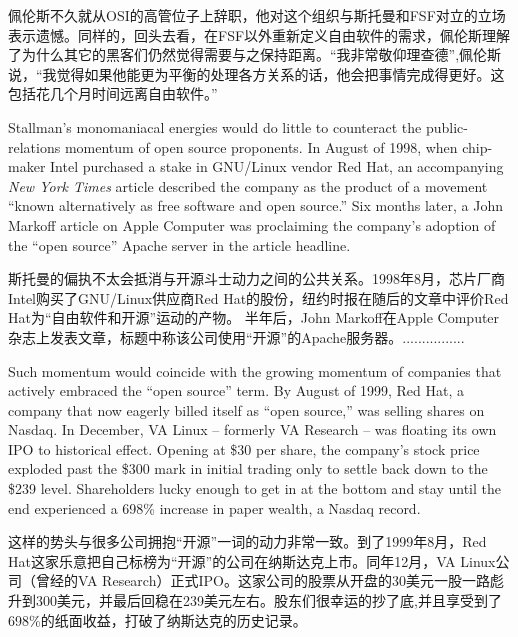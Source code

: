 \ifdefined\chs
佩伦斯不久就从OSI的高管位子上辞职，他对这个组织与斯托曼和FSF对立的立场表示遗憾。同样的，回头去看，在FSF以外重新定义自由软件的需求，佩伦斯理解了为什么其它的黑客们仍然觉得需要与之保持距离。``我非常敬仰理查德'',佩伦斯说，``我觉得如果他能更为平衡的处理各方关系的话，他会把事情完成得更好。这包括花几个月时间远离自由软件。''
\fi

\ifdefined\eng
Stallman's monomaniacal energies would do little to counteract the public-relations momentum of open source proponents. In August of 1998, when chip-maker Intel purchased a stake in GNU/Linux vendor Red Hat, an accompanying \textit{New York Times} article described the company as the product of a movement ``known alternatively as free software and open source.'' Six months later, a John Markoff article on Apple Computer was proclaiming the company's adoption of the ``open source'' Apache server in the article headline.
\fi

\ifdefined\chs
斯托曼的偏执不太会抵消与开源斗士动力之间的公共关系。1998年8月，芯片厂商Intel购买了GNU/Linux供应商Red Hat的股份，纽约时报在随后的文章中评价Red Hat为``自由软件和开源''运动的产物。 半年后，John Markoff在Apple Computer杂志上发表文章，标题中称该公司使用``开源''的Apache服务器。................
\fi

\ifdefined\eng
Such momentum would coincide with the growing momentum of companies that actively embraced the ``open source'' term. By August of 1999, Red Hat, a company that now eagerly billed itself as ``open source,'' was selling shares on Nasdaq. In December, VA Linux -- formerly VA Research -- was floating its own IPO to historical effect. Opening at \$30 per share, the company's stock price exploded past the \$300 mark in initial trading only to settle back down to the \$239 level. Shareholders lucky enough to get in at the bottom and stay until the end experienced a 698\% increase in paper wealth, a Nasdaq record.
\fi

\ifdefined\chs
这样的势头与很多公司拥抱``开源''一词的动力非常一致。到了1999年8月，Red Hat这家乐意把自己标榜为``开源''的公司在纳斯达克上市。同年12月，VA Linux公司（曾经的VA Research）正式IPO。这家公司的股票从开盘的30美元一股一路彪升到300美元，并最后回稳在239美元左右。股东们很幸运的抄了底,并且享受到了698\%的纸面收益，打破了纳斯达克的历史记录。
\fi

